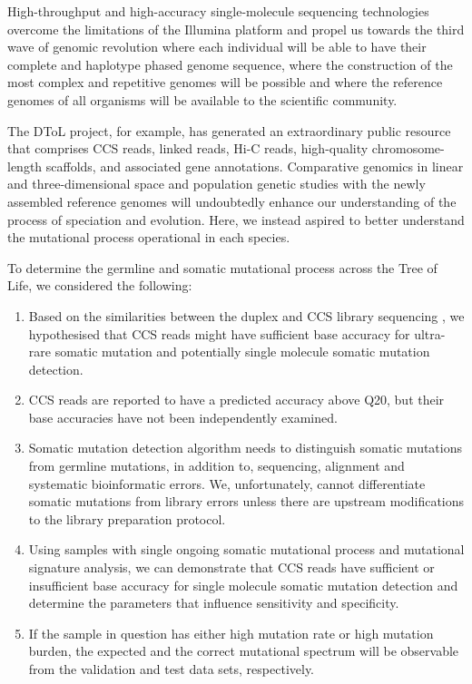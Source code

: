 High-throughput and high-accuracy single-molecule sequencing technologies \cite{} overcome the limitations of the Illumina platform and propel us towards the third wave of genomic revolution where each individual will be able to have their complete and haplotype phased genome sequence, where the construction of the most complex and repetitive genomes will be possible and where the reference genomes of all organisms will be available to the scientific community. 

The DToL project, for example, has generated an extraordinary public resource that comprises CCS reads, linked reads, Hi-C reads, high-quality chromosome-length scaffolds, and associated gene annotations. Comparative genomics in linear and three-dimensional space and population genetic studies with the newly assembled reference genomes will undoubtedly enhance our understanding of the process of speciation and evolution. Here, we instead aspired to better understand the mutational process operational in each species.

To determine the germline and somatic mutational process across the Tree of Life, we considered the following:

\begin{enumerate}
\item Based on the similarities between the duplex \cite{} and CCS library sequencing \cite{}, we hypothesised that CCS reads might have sufficient base accuracy for ultra-rare somatic mutation and potentially single molecule somatic mutation detection.
\item CCS reads are reported to have a predicted accuracy above Q20, but their base accuracies have not been independently examined. 
\item Somatic mutation detection algorithm needs to distinguish somatic mutations from germline mutations, in addition to, sequencing, alignment and systematic bioinformatic errors. We, unfortunately, cannot differentiate somatic mutations from library errors unless there are upstream modifications to the library preparation protocol. 
\item Using samples with single ongoing somatic mutational process and mutational signature analysis, we can demonstrate that CCS reads have sufficient or insufficient base accuracy for single molecule somatic mutation detection and determine the parameters that influence sensitivity and specificity.
\item If the sample in question has either high mutation rate or high mutation burden, the expected and the correct mutational spectrum will be observable from the validation and test data sets, respectively. 
\end{enumerate} 

